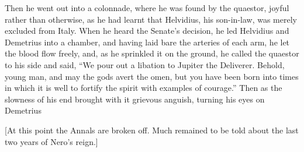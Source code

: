 
Then he went out into a colonnade, where he was found by the quaestor, joyful rather than otherwise, as he had learnt that Helvidius, his son-in-law, was merely excluded from Italy. When he heard the Senate's decision, he led Helvidius and Demetrius into a chamber, and having laid bare the arteries of each arm, he let the blood flow freely, and, as he sprinkled it on the ground, he called the quaestor to his side and said, ``We pour out a libation to Jupiter the Deliverer. Behold, young man, and may the gods avert the omen, but you have been born into times in which it is well to fortify the spirit with examples of courage.'' Then as the slowness of his end brought with it grievous anguish, turning his eyes on Demetrius

[At this point the Annals are broken off. Much remained to be told about the last two years of Nero's reign.]
